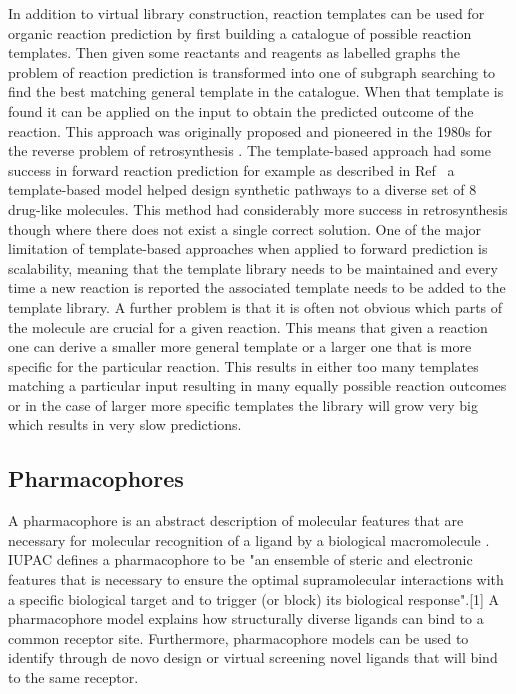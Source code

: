 In addition to virtual library construction, reaction templates can be used for organic reaction prediction by first building a catalogue of possible reaction templates. Then given some reactants and reagents as labelled graphs the problem of reaction prediction is transformed into one of subgraph searching to find the best matching general template in the catalogue. When that template is found it can be applied on the input to obtain the predicted outcome of the reaction. This approach was originally proposed and pioneered in the 1980s for the reverse problem of retrosynthesis \cite{Corey1985ComputerAssistedSynthesis}. The template-based approach had some success in forward reaction prediction for example as described in Ref~\cite{Klucznik2018EfficientLaboratory} a template-based model helped design synthetic pathways to a diverse set of 8 drug-like molecules. This method had considerably more success in retrosynthesis though where there does not exist a single correct solution. One of the major limitation of template-based approaches when applied to forward prediction is scalability, meaning that the template library needs to be maintained and every time a new reaction is reported the associated template needs to be added to the template library. A further problem is that it is often not obvious which parts of the molecule are crucial for a given reaction. This means that given a reaction one can derive a smaller more general template or a larger one that is more specific for the particular reaction. This results in either too many templates matching a particular input resulting in many equally possible reaction outcomes or in the case of larger more specific templates the library will grow very big which results in very slow predictions.

\subsection{Pharmacophores} \label{subsec:pharmacophores}

A pharmacophore is an abstract description of molecular features that are necessary for molecular recognition of a ligand by a biological macromolecule \cite{Kaserer2015PharmacophoreReview}. IUPAC defines a pharmacophore to be "an ensemble of steric and electronic features that is necessary to ensure the optimal supramolecular interactions with a specific biological target and to trigger (or block) its biological response".[1] A pharmacophore model explains how structurally diverse ligands can bind to a common receptor site. Furthermore, pharmacophore models can be used to identify through de novo design or virtual screening novel ligands that will bind to the same receptor.

